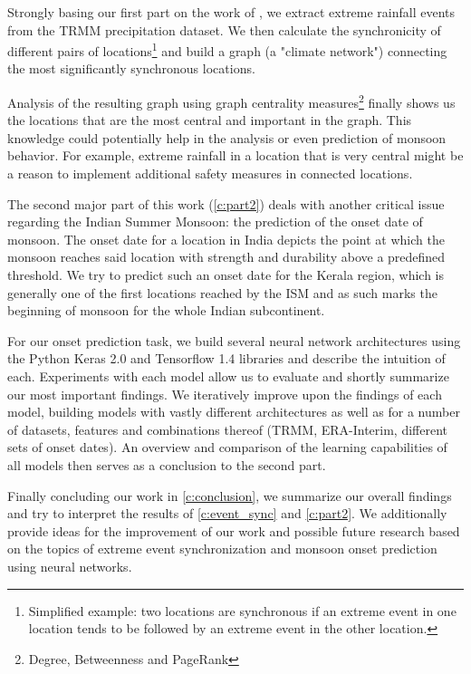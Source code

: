 Strongly basing our first part on the work of \citet{Stolbova.2015}, we extract extreme rainfall events from the TRMM precipitation dataset. We then calculate the synchronicity of different pairs of locations\footnote{Simplified example: two locations are synchronous if an extreme event in one location tends to be followed by an extreme event in the other location.} and build a graph (a "climate network") connecting the most significantly synchronous locations.

Analysis of the resulting graph using graph centrality measures\footnote{Degree, Betweenness and PageRank} finally shows us the locations that are the most central and important in the graph. This knowledge could potentially help in the analysis or even prediction of monsoon behavior. For example, extreme rainfall in a location that is very central might be a reason to implement additional safety measures in connected locations.

The second major part of this work (\cref{c:part2}) deals with another critical issue regarding the Indian Summer Monsoon: the prediction of the onset date of monsoon. The onset date for a location in India depicts the point at which the monsoon reaches said location with strength and durability above a predefined threshold. We try to predict such an onset date for the Kerala region, which is generally one of the first locations reached by the ISM and as such marks the beginning of monsoon for the whole Indian subcontinent.

For our onset prediction task, we build several neural network architectures using the Python Keras 2.0 and Tensorflow 1.4 libraries and describe the intuition of each. Experiments with each model allow us to evaluate and shortly summarize our most important findings. We iteratively improve upon the findings of each model, building models with vastly different architectures as well as for a number of datasets, features and combinations thereof (TRMM, ERA-Interim, different sets of onset dates). An overview and comparison of the learning capabilities of all models then serves as a conclusion to the second part.

Finally concluding our work in \cref{c:conclusion}, we summarize our overall findings and try to interpret the results of \cref{c:event_sync} and \cref{c:part2}. We additionally provide ideas for the improvement of our work and possible future research based on the topics of extreme event synchronization and monsoon onset prediction using neural networks.
